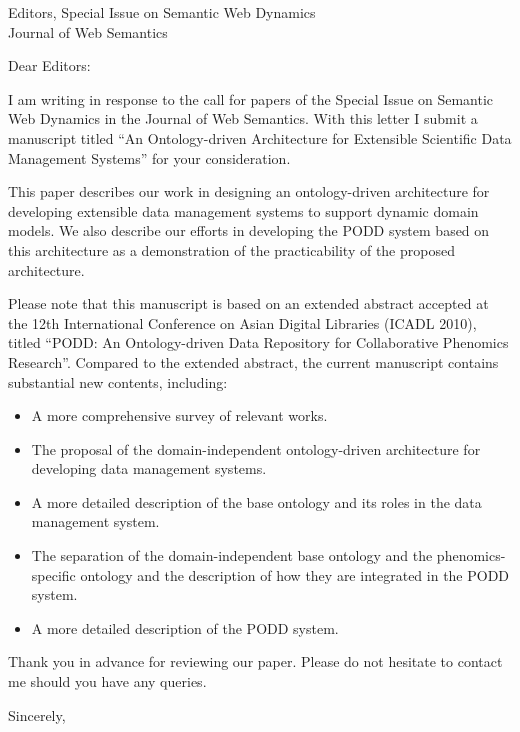 \documentclass{letter}
\begin{document}
\begin{letter}{Editors, Special Issue on Semantic Web Dynamics\\Journal of Web Semantics}

\opening{Dear Editors:}

I am writing in response to the call for papers of the Special Issue
on Semantic Web Dynamics in the Journal of Web Semantics. With this
letter I submit a manuscript titled ``An Ontology-driven
Architecture for Extensible Scientific Data Management Systems'' for
your consideration.

This paper describes our work in designing an ontology-driven
architecture for developing extensible data management systems
to support dynamic domain models. We also describe our
efforts in developing the PODD system based on this
architecture as a demonstration of the practicability of the
proposed architecture.

Please note that this manuscript is based on an extended
abstract accepted at the 12th International Conference on
Asian Digital Libraries (ICADL 2010), titled ``PODD: An
Ontology-driven Data Repository for Collaborative
Phenomics Research''. Compared to the extended abstract,
the current manuscript contains substantial new contents,
including:

\begin{itemize}
\item A more comprehensive survey of relevant works.

\item The proposal of the domain-independent
ontology-driven architecture for developing
data management systems.

\item A more detailed description of the base ontology
and its roles in the data management system.

\item The separation of the domain-independent
base ontology and the phenomics-specific ontology
and the description of how they are integrated in
the PODD system.

\item A more detailed description of the PODD system.
\end{itemize}

Thank you in advance for reviewing our paper. Please
do not hesitate to contact me should you have any
queries.

\closing{Sincerely,}

\end{letter}
\end{document}
